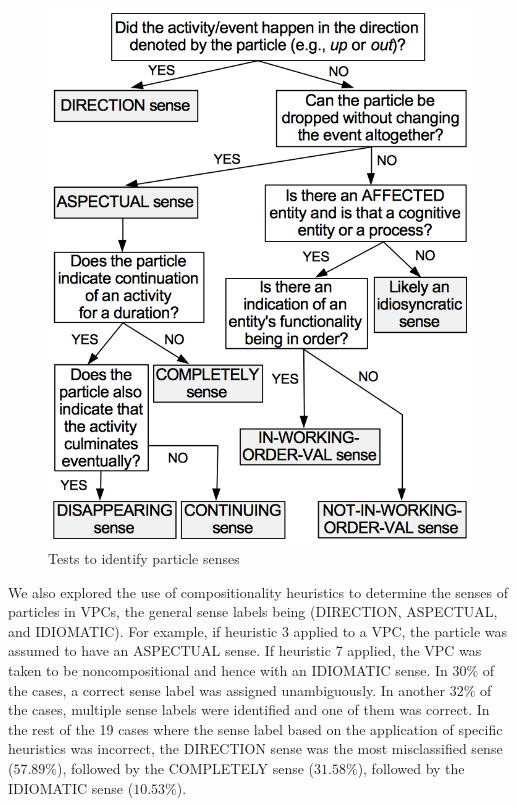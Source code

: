 \documentclass[output=paper,modfonts,nonflat]{langsci/langscibook}
\begin{document}
\begin{figure}[ht]
\includegraphics[scale=0.55]{figures/block_sense_uppercase}
\caption{Tests to identify particle senses}\label{fig:tests-senses}
\end{figure}



We also explored the use of compositionality heuristics to determine the senses of particles in VPCs, the general sense labels being (DIRECTION, ASPECTUAL, and IDIOMATIC). For example, if heuristic 3 applied to a VPC, the particle was assumed to have an ASPECTUAL sense. If heuristic 7 applied, the VPC was taken to be noncompositional and hence with an IDIOMATIC sense. In $30\%$ of the cases, a correct sense label was assigned unambiguously. In another $32\%$ of the cases, multiple sense labels were identified and one of them was correct. In the rest of the 19 cases where the sense label based on the application of specific heuristics was incorrect, the DIRECTION sense was the most misclassified sense ($57.89\%$), followed by the COMPLETELY sense ($31.58\%$), followed by the IDIOMATIC sense ($10.53\%$).
\end{document}

